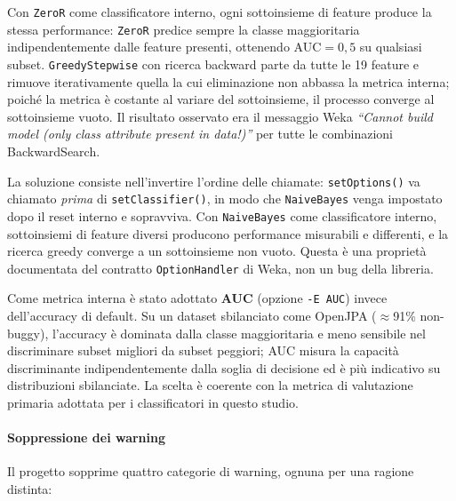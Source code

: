 Con \texttt{ZeroR} come classificatore interno, ogni sottoinsieme di feature produce
la stessa performance: \texttt{ZeroR} predice sempre la classe maggioritaria
indipendentemente dalle feature presenti, ottenendo AUC$=0{,}5$ su qualsiasi subset.
\texttt{GreedyStepwise} con ricerca backward parte da tutte le 19 feature e rimuove
iterativamente quella la cui eliminazione non abbassa la metrica interna; poiché la
metrica è costante al variare del sottoinsieme, il processo converge al sottoinsieme
vuoto. Il risultato osservato era il messaggio Weka
\textit{``Cannot build model (only class attribute present in data!)''}
per tutte le combinazioni BackwardSearch.

La soluzione consiste nell'invertire l'ordine delle chiamate: \texttt{setOptions()}
va chiamato \emph{prima} di \texttt{setClassifier()}, in modo che \texttt{NaiveBayes}
venga impostato dopo il reset interno e sopravviva. Con \texttt{NaiveBayes} come
classificatore interno, sottoinsiemi di feature diversi producono performance
misurabili e differenti, e la ricerca greedy converge a un sottoinsieme non vuoto.
Questa è una proprietà documentata del contratto \texttt{OptionHandler} di Weka,
non un bug della libreria.

Come metrica interna è stato adottato \textbf{AUC} (opzione \texttt{-E AUC}) invece
dell'accuracy di default. Su un dataset sbilanciato come OpenJPA
($\approx$91\% non-buggy), l'accuracy è dominata dalla classe maggioritaria e meno
sensibile nel discriminare subset migliori da subset peggiori; AUC misura la capacità
discriminante indipendentemente dalla soglia di decisione ed è più indicativo su
distribuzioni sbilanciate. La scelta è coerente con la metrica di valutazione primaria
adottata per i classificatori in questo studio.

\paragraph{Soppressione dei warning}

Il progetto sopprime quattro categorie di warning, ognuna per una ragione distinta:

